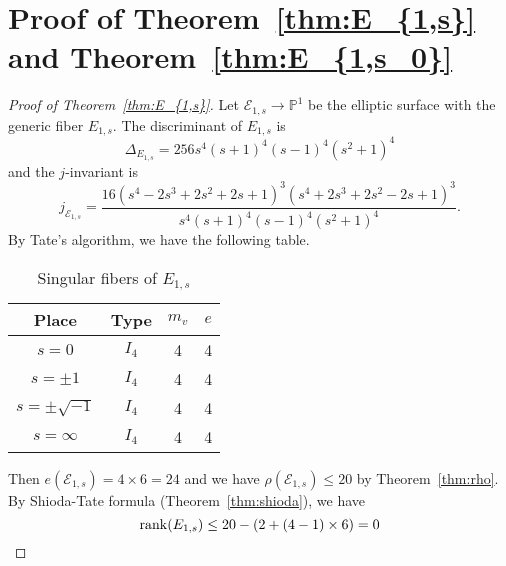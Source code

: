 \documentclass[main]{subfiles}
\begin{document}
\section{Proof of Theorem~\ref{thm:E_{1,s}} and Theorem~\ref{thm:E_{1,s_0}}}

\begin{proof}[Proof of Theorem~\ref{thm:E_{1,s}}]

    Let $\mathcal{E}_{1,s} \to \mathbb{P}^{1}$ be the elliptic surface with the generic fiber $E_{1,s}$.
    The discriminant of $E_{1,s}$ is
    \begin{equation}
        \label{eq:discriminant1s}
        \Delta_{E_{1,s}} = 256s^{4} (s + 1)^{4} (s - 1)^{4} (s^{2} + 1)^{4}
    \end{equation}
    and the $j$-invariant is
    \begin{equation*}
        j_{\mathcal{E}_{1,s}} = \frac{16 (s^{4} - 2 s^{3} + 2 s^{2} + 2 s + 1)^{3} (s^{4} + 2 s^{3} + 2 s^{2} - 2 s + 1)^{3}}{s ^{4} (s + 1)^{4} (s - 1)^{4}(s^{2} + 1)^{4}}.
    \end{equation*}
    By Tate's algorithm, we have the following table.
    \begin{table}[H]
        \centering
        \caption{Singular fibers of $E_{1,s}$}
        \begin{tabular}{|c|c|c|c|}
            \hline
            Place             & Type  & $m_v$ & $e$ \\
            \hline
            $s=0$             & $I_4$ & 4     & 4   \\
            $s=\pm 1$         & $I_4$ & 4     & 4   \\
            $s=\pm \sqrt{-1}$ & $I_4$ & 4     & 4   \\
            $s=\infty$        & $I_4$ & 4     & 4   \\
            \hline
        \end{tabular}
    \end{table}

    Then $e(\mathcal{E}_{1,s}) = 4 \times 6 = 24$ and we have $\rho(\mathcal{E}_{1,s}) \leq 20$ by Theorem~\ref{thm:rho}.
    By Shioda-Tate formula (Theorem~\ref{thm:shioda}), we have
    \begin{equation*}
        \operatorname{rank}(E_{1,s}) \leq 20 - (2 + (4 - 1) \times 6) = 0
    \end{equation*}


\end{proof}
\end{document}
